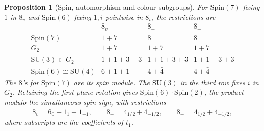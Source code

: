 \documentclass[aps,pra,onecolumn,superscriptaddress,nofootinbib,10pt]{revtex4-2}
\newtheorem{proposition}[theorem]{Proposition}
\theoremstyle{definition}
\theoremstyle{remark}
\newcommand{\SU}{\mathrm{SU}}
\begin{document}
\begin{proposition}[Spin, automorphism and colour subgroups]\label{tr:stab}
For \(\mathrm{Spin}(7)\) fixing \(1\) in \(8_v\) and
\(\mathrm{Spin}(6)\) fixing \(1,i\) pointwise in \(8_v\), the restrictions are
\[
\begin{array}{c|ccc}
 &8_v&8_+&8_-\\ \hline
 \mathrm{Spin}(7)&1+7&8&8\\
 G_2&1+7&1+7&1+7\\
 \SU(3)\subset G_2&1+1+3+\bar3&1+1+3+\bar3&1+1+3+\bar3\\
 \mathrm{Spin}(6)\cong\SU(4)&6+1+1&4+\bar4&4+\bar4
\end{array}
\]
The \(8\)'s for \(\mathrm{Spin}(7)\) are its spin module.
The \(\SU(3)\) in the third row fixes \(i\) in \(G_2\).
Retaining the first plane rotation gives
\(\mathrm{Spin}(6)\cdot\mathrm{Spin}(2)\), the product modulo the
simultaneous spin sign, with restrictions
\[
 8_v=6_0+1_1+1_{-1},\qquad
 8_+=4_{1/2}+\bar4_{-1/2},\qquad
 8_-=\bar4_{1/2}+4_{-1/2},
\]
where subscripts are the coefficients of \(t_1\).
\end{proposition}
\end{document}
